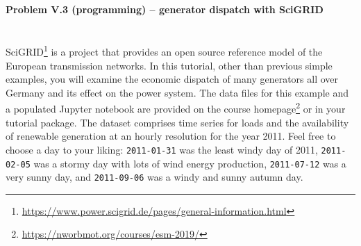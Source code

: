 \documentclass[11pt,a4paper,fleqn]{scrartcl}
\begin{document}
\newpage
\paragraph{Problem V.3 (programming) -- generator dispatch with SciGRID}~\\

SciGRID\footnote{\url{https://www.power.scigrid.de/pages/general-information.html}} is a project that provides an open source reference model of the European transmission networks. In this tutorial, other than previous simple examples, you will examine the economic dispatch of many generators all over Germany and its effect on the power system. The data files for this example and a populated Jupyter notebook are provided on the course homepage\footnote{\url{https://nworbmot.org/courses/esm-2019/}} or in your tutorial package. The dataset comprises time series for loads and the availability of renewable generation at an hourly resolution for the year 2011. Feel free to choose a day to your liking: \texttt{2011-01-31} was the least windy day of 2011, \texttt{2011-02-05} was a stormy day with lots of wind energy production, \texttt{2011-07-12} was a very sunny day, and \texttt{2011-09-06} was a windy and sunny autumn day.
\end{document}
